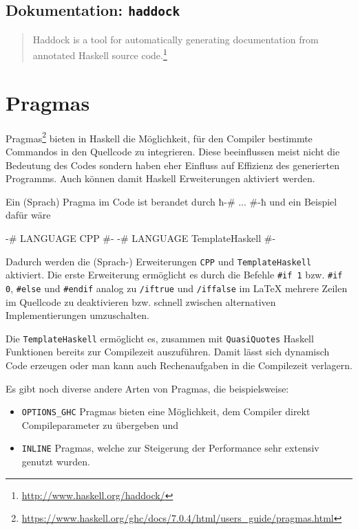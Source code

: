 \subsection{Dokumentation: \texttt{haddock}}
\begin{quote}
  Haddock is a tool for automatically generating documentation from annotated
  Haskell source code.\footnote{\url{http://www.haskell.org/haddock/}}
\end{quote}

\section{Pragmas} %
Pragmas\footnote{\url{https://www.haskell.org/ghc/docs/7.0.4/html/users_guide/pragmas.html}}
bieten in Haskell die Möglichkeit, für den Compiler bestimmte Commandos in den
Quellcode zu integrieren. Diese beeinflussen meist nicht die Bedeutung des
Codes sondern haben eher Einfluss auf Effizienz des generierten Programms. Auch
können damit Haskell Erweiterungen aktiviert werden.

Ein (Sprach) Pragma im Code ist berandet durch ħ{-# ... #-}ħ und ein Beispiel
dafür wäre
\begin{hcode}
{-# LANGUAGE CPP #-}
{-# LANGUAGE TemplateHaskell #-}
\end{hcode}
Dadurch werden die (Sprach-) Erweiterungen \texttt{CPP} und
\texttt{TemplateHaskell} aktiviert. Die erste Erweiterung ermöglicht es durch
die Befehle \texttt{\#if 1} bzw. \texttt{\#if 0}, \texttt{\#else} und
\texttt{\#endif} analog zu \texttt{\slash{}iftrue} und
\texttt{\slash{}iffalse} im \LaTeX{} mehrere Zeilen im Quellcode zu
deaktivieren bzw. schnell zwischen alternativen Implementierungen umzuschalten.

Die \texttt{TemplateHaskell} ermöglicht es, zusammen mit \texttt{QuasiQuotes}
Haskell Funktionen bereits zur Compilezeit auszuführen. Damit lässt sich
dynamisch Code erzeugen oder man kann auch Rechenaufgaben in die Compilezeit
verlagern.

Es gibt noch diverse andere Arten von Pragmas, die beispielsweise:
\begin{itemize}
  \item \texttt{OPTIONS\_GHC} Pragmas bieten eine Möglichkeit, dem Compiler
  direkt Compileparameter zu übergeben und
  \item \texttt{INLINE} Pragmas, welche zur Steigerung der Performance sehr
  extensiv genutzt wurden.
\end{itemize}
